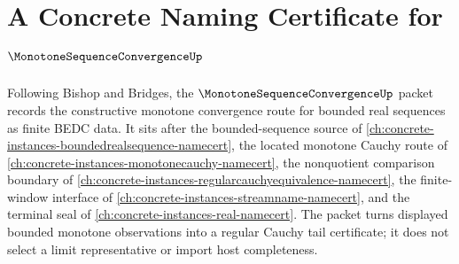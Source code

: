 \chapter{A Concrete Naming Certificate for $\MonotoneSequenceConvergenceUp$}
\label{ch:concrete-instances-monotone-sequence-convergence-namecert}

Following Bishop and Bridges, the $\MonotoneSequenceConvergenceUp$ packet records the constructive monotone convergence route for bounded real sequences as finite BEDC data. It sits after the bounded-sequence source of \autoref{ch:concrete-instances-boundedrealsequence-namecert}, the located monotone Cauchy route of \autoref{ch:concrete-instances-monotonecauchy-namecert}, the nonquotient comparison boundary of \autoref{ch:concrete-instances-regularcauchyequivalence-namecert}, the finite-window interface of \autoref{ch:concrete-instances-streamname-namecert}, and the terminal seal of \autoref{ch:concrete-instances-real-namecert}. The packet turns displayed bounded monotone observations into a regular Cauchy tail certificate; it does not select a limit representative or import host completeness.

